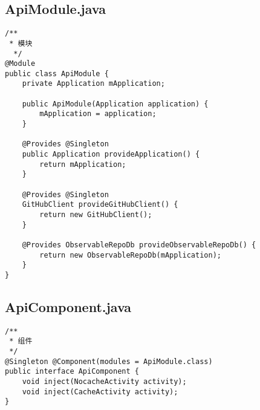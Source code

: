 \documentclass[9pt, b5paper]{article}
\begin{document}
\subsection{ApiModule.java}
\label{sec-7-2}
\begin{verbatim}
/**
 * 模块
  */
@Module
public class ApiModule {
    private Application mApplication;

    public ApiModule(Application application) {
        mApplication = application;
    }

    @Provides @Singleton
    public Application provideApplication() {
        return mApplication;
    }

    @Provides @Singleton
    GitHubClient provideGitHubClient() {
        return new GitHubClient();
    }

    @Provides ObservableRepoDb provideObservableRepoDb() {
        return new ObservableRepoDb(mApplication);
    }
}
\end{verbatim}
\subsection{ApiComponent.java}
\label{sec-7-3}
\begin{verbatim}
/**
 * 组件
 */
@Singleton @Component(modules = ApiModule.class)
public interface ApiComponent {
    void inject(NocacheActivity activity);
    void inject(CacheActivity activity);
}
\end{verbatim}
\end{document}
